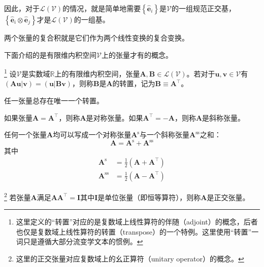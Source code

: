 \documentclass[main.tex]{subfiles}
\begin{document}
因此，对于$\mathcal{L}\left(\mathcal{V}\right)$的情况，就是简单地需要$\left\{\mathbf{\hat{e}}_i\right\}$是$\mathcal{V}$的一组规范正交基，$\left\{\mathbf{\hat{e}}_i\otimes\mathbf{\hat{e}}_j\right\}$才是$\mathcal{L}\left(\mathcal{V}\right)$的一组基。

\begin{definition}
两个张量的复合积就是它们作为两个线性变换的复合变换。
\end{definition}

下面介绍的是有限维内积空间$\mathcal{V}$上的张量才有的概念。

\begin{definition}[张量的转置]\footnote{这里定义的“转置”对应的是复数域上线性算符的伴随（adjoint）的概念，后者也仅是复数域上线性算符的转置（transpose）的一个特例。这里使用“转置”一词只是遵循大部分流变学文本的惯例。}
设$\mathcal{V}$是实数域$\mathbb{R}$上的有限维内积空间，张量$\mathbf{A},\mathbf{B}\in\mathcal{L}\left(\mathcal{V}\right)$。若对于$\mathbf{u},\mathbf{v}\in\mathcal{V}$有$\left(\mathbf{Au}|\mathbf{v}\right)=\left(\mathbf{u}|\mathbf{Bv}\right)$，则称$\mathbf{B}$是$\mathbf{A}$的转置，记为$\mathbf{B}\equiv\mathbf{A}^\intercal$。
\end{definition}

\begin{theorem}
任一张量总存在唯一一个转置。
\end{theorem}

\begin{definition}[对称张量与斜称张量]
如果张量$\mathbf{A}=\mathbf{A}^\intercal$，则称$\mathbf{A}$是对称张量。如果$\mathbf{A}^\intercal=-\mathbf{A}$，则称$\mathbf{A}$是斜称张量。
\end{definition}

\begin{theorem}
任何一个张量$\mathbf{A}$均可以写成一个对称张量$\mathbf{A}^\mathrm{s}$与一个斜称张量$\mathbf{A}^\mathrm{ss}$之和：
\[\mathbf{A}=\mathbf{A}^\mathrm{s}+\mathbf{A}^\mathrm{ss}\]
其中
\[\begin{split}\mathbf{A}^\mathrm{s}&=\frac{1}{2}\left(\mathbf{A}+\mathbf{A}^\intercal\right)\\\mathbf{A}^\mathrm{ss}&=\frac{1}{2}\left(\mathbf{A}-\mathbf{A}^\intercal\right)\end{split}\]
\end{theorem}

\begin{definition}[正交张量]\footnote{这里的正交张量对应复数域上的幺正算符（unitary operator）的概念。}
若张量$\mathbf{A}$满足$\mathbf{AA}^\intercal=\mathbf{I}$其中$\mathbf{I}$是单位张量（即恒等算符），则称$\mathbf{A}$是正交张量。
\end{definition}
\end{document}
